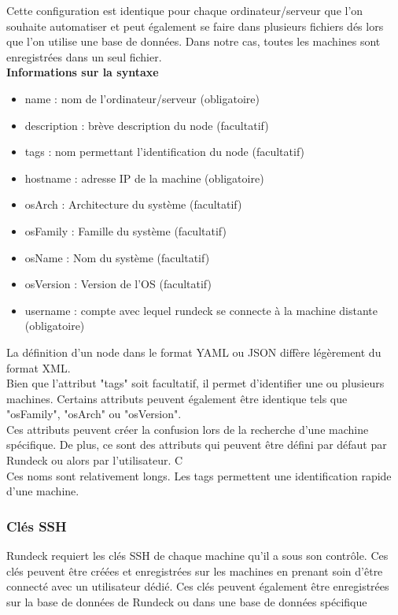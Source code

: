 \documentclass[12pt]{article}
\begin{document}
\vspace{0.5cm}
Cette configuration est identique pour chaque ordinateur/serveur que l'on souhaite automatiser et peut également se faire dans plusieurs fichiers dés lors que l'on utilise une base de données. Dans notre cas, toutes les machines sont enregistrées dans un seul fichier.
\vspace{0.5cm}
\\
\textbf{Informations sur la syntaxe}
\begin{itemize}
    \item name : nom de l'ordinateur/serveur (obligatoire)
    \item description : brève description du node (facultatif)
    \item tags : nom permettant l'identification du node (facultatif)
    \item hostname : adresse IP de la machine (obligatoire)
    \item osArch : Architecture du système (facultatif)
    \item osFamily : Famille du système (facultatif)
    \item osName : Nom du système (facultatif)
    \item osVersion : Version de l'OS (facultatif)
    \item username : compte avec lequel rundeck se connecte à la machine distante (obligatoire)
\end{itemize}
\vspace{0.5cm}
La définition d'un node dans le format YAML ou JSON diffère légèrement du format XML.
\\
Bien que l'attribut "tags" soit facultatif, il permet d'identifier une ou plusieurs machines. Certains attributs peuvent également être identique tels que "osFamily", "osArch" ou "osVersion". 
\\
Ces attributs peuvent créer la confusion lors de la recherche d'une machine spécifique. De plus, ce sont des attributs qui peuvent être défini par défaut par Rundeck ou alors par l'utilisateur. C
\\
Ces noms sont relativement longs. Les tags permettent une identification rapide d'une machine.

\subsubsection{Clés SSH}
Rundeck requiert les clés SSH de chaque machine qu'il a sous son contrôle. Ces clés peuvent être créées et enregistrées sur les machines en prenant soin d'être connecté avec un utilisateur dédié. Ces clés peuvent également être enregistrées sur la base de données de Rundeck ou dans une base de données spécifique
\end{document}
